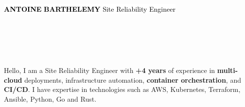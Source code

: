 \documentclass[10pt]{developercv}
\begin{document}
\hspace{-7pt}
\begin{minipage}[t]{0.50\textwidth}
	\vspace{-\baselineskip}
	\vspace{7pt}
	\colorbox{white}{{\HUGE\textcolor{black}{\textbf{\MakeUppercase{Antoine}}}}}
	\colorbox{white}{{\HUGE\textcolor{black}{\textbf{\MakeUppercase{Barthelemy}}}}}
	\colorbox{white}{\textcolor{black}{\huge{Site Reliability Engineer}}}
	\vspace{6pt}
\end{minipage}
\begin{minipage}[t]{0.28\textwidth}
	\vspace{-\baselineskip}
	\vspace{9pt}
	\\
	\\
	\\
	\\
\end{minipage}
\begin{minipage}[t]{0.275\textwidth}
	\vspace{-\baselineskip}
	\hspace{0.1cm}
\end{minipage}

\vspace{-10pt}


\hspace{0pt}\begin{minipage}[t]{1.00\textwidth}
	\vspace{-\baselineskip}
	{Hello, I am a Site Reliability Engineer with \textbf{+4 years} of experience in \textbf{multi-cloud} deployments, infrastructure automation, \textbf{container orchestration}, and \textbf{CI/CD}. I have expertise in technologies such as AWS, Kubernetes, Terraform, Ansible, Python, Go and Rust.} %
\end{minipage}
\hfill

\end{document}
